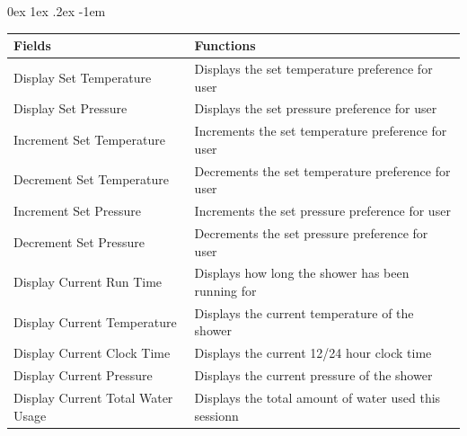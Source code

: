 \documentclass[12pt, a4paper]{article}
\makeatletter
\renewcommand\paragraph{\@startsection{paragraph}{5}{\parindent}%
  {0ex \@plus1ex \@minus.2ex}%
  {-1em}%
  {\normalfont\normalsize\bfseries}}
\makeatother
\begin{document}
                \paragraph{}
                    \begingroup
                        \centering
                        \begin{flushleft}
                            \resizebox{\linewidth}{!} {
                                \begin{tabular}{| m{0.4\linewidth} | m{0.6\linewidth} |}
                                    \hline
                                    \textbf {Fields} & \textbf {Functions} \\ \hline
                                    Display Set Temperature & Displays the set temperature preference for user  \\ \hline
                                    Display Set Pressure & Displays the set pressure preference for user  \\ \hline
                                    Increment Set Temperature & Increments the set temperature preference for user  \\ \hline
                                    Decrement Set Temperature & Decrements the set temperature preference for user  \\ \hline
                                    Increment Set Pressure & Increments the set pressure preference for user  \\ \hline
                                    Decrement Set Pressure & Decrements the set pressure preference for user \\ \hline
                                    Display Current Run Time & Displays how long the shower has been running for  \\ \hline
                                    Display Current Temperature & Displays the current temperature of the shower  \\ \hline
                                    Display Current Clock Time & Displays the current 12/24 hour clock time  \\ \hline
                                    Display Current Pressure & Displays the current pressure of the shower  \\ \hline
                                    Display Current Total Water Usage & Displays the total amount of water used this sessionn  \\
                                    \hline
                                \end{tabular}
                            }
                            \label{tbl:userinterfacetable}
                        \end{flushleft}
\end{document}
